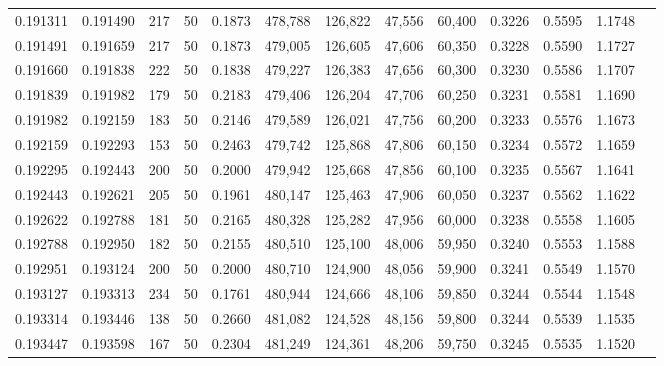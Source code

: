\begin{tabular}{rrrrrrrrrrrrr}
0.191311 & 0.191490 &   217 &  50 &                                     0.1873 & 478,788 & 126,822 &  47,556 &  60,400 & 0.3226 & 0.5595 & 1.1748 \\
0.191491 & 0.191659 &   217 &  50 &                                     0.1873 & 479,005 & 126,605 &  47,606 &  60,350 & 0.3228 & 0.5590 & 1.1727 \\
0.191660 & 0.191838 &   222 &  50 &                                     0.1838 & 479,227 & 126,383 &  47,656 &  60,300 & 0.3230 & 0.5586 & 1.1707 \\
0.191839 & 0.191982 &   179 &  50 &                                     0.2183 & 479,406 & 126,204 &  47,706 &  60,250 & 0.3231 & 0.5581 & 1.1690 \\
0.191982 & 0.192159 &   183 &  50 &                                     0.2146 & 479,589 & 126,021 &  47,756 &  60,200 & 0.3233 & 0.5576 & 1.1673 \\
0.192159 & 0.192293 &   153 &  50 &                                     0.2463 & 479,742 & 125,868 &  47,806 &  60,150 & 0.3234 & 0.5572 & 1.1659 \\
0.192295 & 0.192443 &   200 &  50 &                                     0.2000 & 479,942 & 125,668 &  47,856 &  60,100 & 0.3235 & 0.5567 & 1.1641 \\
0.192443 & 0.192621 &   205 &  50 &                                     0.1961 & 480,147 & 125,463 &  47,906 &  60,050 & 0.3237 & 0.5562 & 1.1622 \\
0.192622 & 0.192788 &   181 &  50 &                                     0.2165 & 480,328 & 125,282 &  47,956 &  60,000 & 0.3238 & 0.5558 & 1.1605 \\
0.192788 & 0.192950 &   182 &  50 &                                     0.2155 & 480,510 & 125,100 &  48,006 &  59,950 & 0.3240 & 0.5553 & 1.1588 \\
0.192951 & 0.193124 &   200 &  50 &                                     0.2000 & 480,710 & 124,900 &  48,056 &  59,900 & 0.3241 & 0.5549 & 1.1570 \\
0.193127 & 0.193313 &   234 &  50 &                                     0.1761 & 480,944 & 124,666 &  48,106 &  59,850 & 0.3244 & 0.5544 & 1.1548 \\
0.193314 & 0.193446 &   138 &  50 &                                     0.2660 & 481,082 & 124,528 &  48,156 &  59,800 & 0.3244 & 0.5539 & 1.1535 \\
0.193447 & 0.193598 &   167 &  50 &                                     0.2304 & 481,249 & 124,361 &  48,206 &  59,750 & 0.3245 & 0.5535 & 1.1520 \\

\end{tabular}
